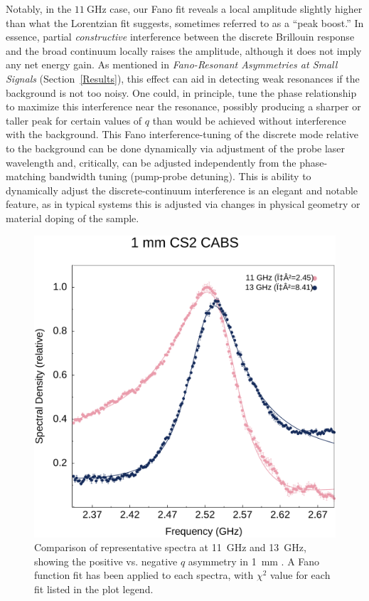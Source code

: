 Notably, in the \(\SI{11}{\giga\hertz}\) case, our Fano fit reveals a local amplitude slightly higher than what the Lorentzian fit suggests, sometimes referred to as a “peak boost.” In essence, partial \emph{constructive} interference between the discrete Brillouin response and the broad continuum locally raises the amplitude, although it does not imply any net energy gain. As mentioned in \textit{Fano-Resonant Asymmetries at Small Signals} (Section~\ref{Results}), this effect can aid in detecting weak resonances if the background is not too noisy. One could, in principle, tune the phase relationship to maximize this interference near the resonance, possibly producing a sharper or taller peak for certain values of \(q\) than would be achieved without interference with the background. This Fano interference-tuning of the discrete mode relative to the background can be done dynamically via adjustment of the probe laser wavelength and, critically, can be adjusted independently from the phase-matching bandwidth tuning (pump-probe detuning). This is ability to dynamically adjust the discrete-continuum interference is an elegant and notable feature, as in typical systems this is adjusted via changes in physical geometry or material doping of the sample.\cite{ko2023full, gu2020fano, rieger2023fano}

\begin{figure}[ht]
  \centering
  \includegraphics[width=\textwidth]{figs/3-CoBS/CS2FanoCompare.pdf}
  \caption{Comparison of representative spectra at \SI{11}{\giga\hertz} and \SI{13}{\giga\hertz}, showing the positive vs. negative \(q\) asymmetry in \SI{1}{\milli\meter} . A Fano function fit has been applied to each spectra, with \(\chi^{2}\) value for each fit listed in the plot legend.}
  \label{fig:CS2FanoCompare}
\end{figure}

